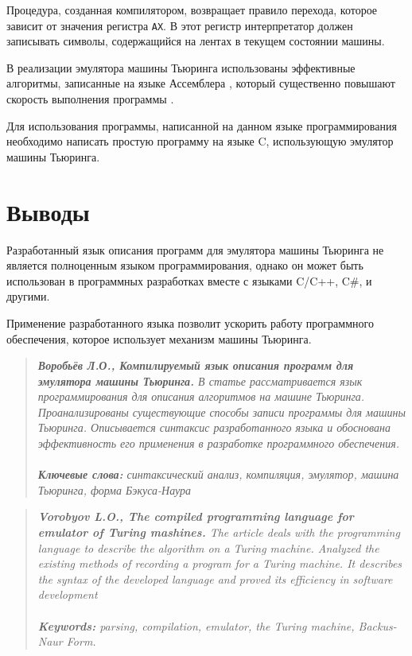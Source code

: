 \documentclass[10pt, normalheadings]{scrartcl}
\begin{document}
\begin{multicols}{2}
	
Процедура, созданная компилятором, возвращает правило перехода, которое зависит от значения регистра  \texttt{AX}. В этот регистр интерпретатор должен записывать символы, содержащийся на лентах в текущем состоянии машины.

В реализации эмулятора машины Тьюринга использованы эффективные алгоритмы, записанные на языке Ассемблера \cite{Magda_ASM_Pentium}, который существенно повышают скорость выполнения программы \cite{Magda_ASM_Windows}.

Для использования программы, написанной на данном языке программирования необходимо написать простую программу на языке C, использующую эмулятор машины Тьюринга.

\section*{Выводы}

Разработанный язык описания программ для эмулятора машины Тьюринга не является полноценным языком программирования, однако он может быть использован в программных разработках вместе с языками C/C++, C\#, и другими.

Применение разработанного языка позволит ускорить работу программного обеспечения, которое использует механизм машины Тьюринга.


 

\end{multicols}

\begin{abstract}\itshape \noindent
	\textbf{Воробьёв Л.О., Компилируемый язык описания программ для эмулятора машины Тьюринга.}
	В статье рассматривается язык программирования для описания алгоритмов на машине Тьюринга. Проанализированы существующие способы записи программы для машины Тьюринга.
	Описывается синтаксис разработанного языка и обоснована эффективность его применения в разработке программного обеспечения.
	\\ \\
	\textbf{Ключевые слова:} синтаксический анализ, компиляция, эмулятор, машина Тьюринга, форма Бэкуса-Наура
\end{abstract}

\begin{abstract}\itshape \noindent
	\textbf{Vorobyov L.O., The compiled programming language for emulator of Turing mashines.}
	The article deals with the programming language to describe the algorithm on a Turing machine. Analyzed the existing methods of recording a program for a Turing machine.
	It describes the syntax of the developed language and proved its efficiency in software development
	\\ \\
	\textbf{Keywords:} parsing, compilation, emulator, the Turing machine, Backus-Naur Form.
\end{abstract}
\end{document}
